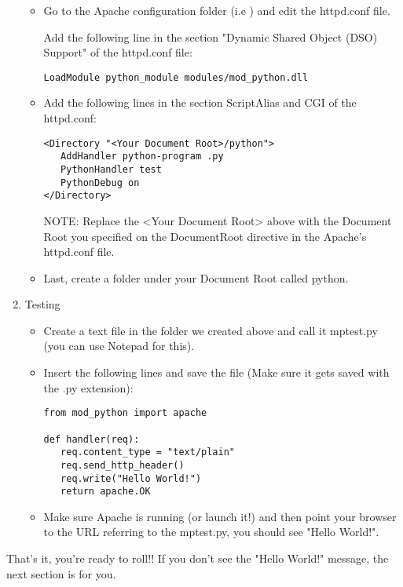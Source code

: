 \begin{enumerate}
\begin{itemize}
\item
Go to the Apache configuration folder (i.e ) and edit the httpd.conf file. 
            
Add the following line in the section "Dynamic Shared Object (DSO)
Support" of the httpd.conf file:

\begin{verbatim}
LoadModule python_module modules/mod_python.dll
\end{verbatim}                    

\item
Add the following lines in the section ScriptAlias and CGI of the httpd.conf: 

\begin{verbatim}                         
<Directory "<Your Document Root>/python">
   AddHandler python-program .py
   PythonHandler test
   PythonDebug on
</Directory>
\end{verbatim}                
    
                    
NOTE: Replace the <Your Document Root> above with the Document Root
you specified on the DocumentRoot directive in the Apache's httpd.conf
file.
                    
\item
Last, create a folder under your Document Root called python. 

\end{itemize}

\item
Testing

\begin{itemize}

\item            
Create a text file in the folder we created above and call it mptest.py
(you can use Notepad for this).
     
\item       
Insert the following lines and save the file (Make sure it gets saved
with the .py extension):

\begin{verbatim}                    
from mod_python import apache

def handler(req):
   req.content_type = "text/plain" 
   req.send_http_header()
   req.write("Hello World!")
   return apache.OK
\end{verbatim}                   

\item            
Make sure Apache is running (or launch it!) and then point your
browser to the URL referring to the mptest.py, you should see "Hello
World!".
     
\end{itemize}
\end{enumerate}
       
That's it, you're ready to roll!! If you don't see the "Hello World!"
message, the next section is for you.

